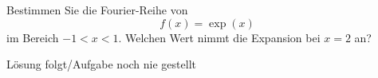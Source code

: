 \documentclass{atistandalonetask}
\begin{document}
  \begin{atiTask}[
    title = \textsc{Fourier}-Reihe I
  ]
  
 Bestimmen Sie die Fourier-Reihe von
 \[
 f(x)=\exp(x)
 \]
 im Bereich $-1<x<1$. Welchen Wert nimmt die Expansion bei $x=2$ an?
  \end{atiTask}
  \begin{atiSolution}
  Lösung folgt/Aufgabe noch nie gestellt
  
  \end{atiSolution}
\end{document}
